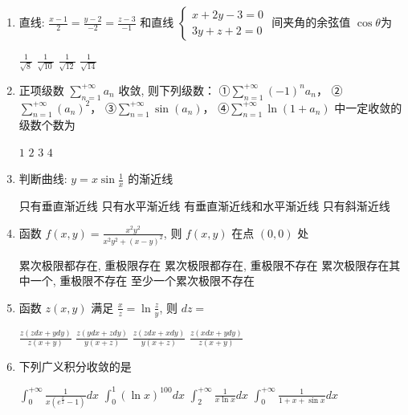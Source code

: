 \begin{enumerate}
\begin{enumerate}
\item 
直线: $\frac{x-1}{2}=\frac{y-2}{-2}=\frac{z-3}{-1}$ 和直线 $\left\{\begin{array}{l}x+2 y-3=0 \\ 3 y+z+2=0\end{array}\right.$ 间夹角的余弦值 $\cos \theta$为  



\fourchoices
{$\frac{1}{\sqrt{8}}$}
{$\frac{1}{\sqrt{10}}$}
{$\frac{1}{\sqrt{12}}$}
{$\frac{1}{\sqrt{14}}$}

\item 
正项级数 $\sum\limits_{n=1}^{+\infty} a_{n}$ 收敛, 则下列级数：
①$\sum\limits_{n=1}^{+\infty}(-1)^{n} a_{n}$，
②$\sum\limits_{n=1}^{+\infty}\left(a_{n}\right)^{2}$，
③$\sum\limits_{n=1}^{+\infty} \sin \left(a_{n}\right)$，
④$\sum\limits_{n=1}^{+\infty} \ln \left(1+a_{n}\right)$
中一定收敛的级数个数为  



\fourchoices
{$ 1 $}
{$ 2 $}
{$ 3 $}
{$ 4 $}


\item 
判断曲线: $y=x \sin \frac{1}{x}$ 的渐近线  

\fourchoices
{只有垂直渐近线}
{只有水平渐近线}
{有垂直渐近线和水平渐近线}
{只有斜渐近线}


\item 
函数 $f(x, y)=\frac{x^{2} y^{2}}{x^{2} y^{2}+(x-y)^{2}}$, 则 $f(x, y)$ 在点 $(0,0)$ 处  

\fourchoices
{累次极限都存在, 重极限存在}
{累次极限都存在, 重极限不存在}
{累次极限存在其中一个, 重极限不存在}
{至少一个累次极限不存在}

\item 
函数 $z(x, y)$ 满足 $\frac{x}{z}=\ln \frac{z}{y}$, 则 $d z=$  

\fourchoices
{$\frac{z(z d x+y d y)}{z(x+y)}$}
{$\frac{z(y d x+z d y)}{y(x+z)}$}
{$ \frac{z(z d x+x d y)}{y(x+z)}$}
{$\frac{z(x d x+y d y)}{z(x+y)}$}

\item 
下列广义积分收敛的是  


\fourchoices
{$\int_{0}^{+\infty} \frac{1}{x\left(e^{\frac{x}{2}}-1\right)} d x$}
{$\int_{0}^{1}(\ln x)^{100} d x$}
{$ \int_{2}^{+\infty} \frac{1}{x \ln x} d x$}
{$\int_{0}^{+\infty} \frac{1}{1+x+\sin x} d x$}







\end{enumerate}




\end{enumerate}
